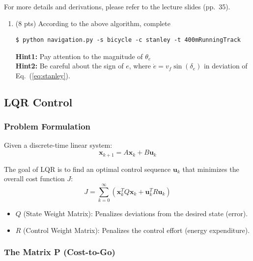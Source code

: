 \documentclass[11pt]{article}
\begin{document}
For more details and derivations, please refer to the lecture slides (pp.~35).

\begin{enumerate}
    \item \textbf{\faPython} (8 pts) According to the above algorithm, complete \textcolor{teal}{}
    \begin{lstlisting}
$ python navigation.py -s bicycle -c stanley -t 400mRunningTrack
    \end{lstlisting}
    \textbf{Hint1:} Pay attention to the magnitude of $\theta_e$ \\
    \textbf{Hint2:} Be careful about the sign of $e$, where $\dot{e} = v_f\sin(\delta_e)$ in deviation of Eq.~(\ref{eq:stanley}).
\end{enumerate}



\subsection{LQR Control}

\subsubsection*{Problem Formulation}

Given a discrete-time linear system:
\begin{equation}
    \mathbf{x}_{k+1} = A \mathbf{x}_k + B \mathbf{u}_k
\end{equation}

The goal of LQR is to find an optimal control sequence $\mathbf{u}_k$ that minimizes the overall cost function $J$:
\begin{equation}
    J = \sum_{k=0}^{\infty} (\mathbf{x}_k^T Q \mathbf{x}_k + \mathbf{u}_k^T R \mathbf{u}_k)
\end{equation}

\begin{itemize}
    \item $Q$ (State Weight Matrix): Penalizes deviations from the desired state (error).
    \item $R$ (Control Weight Matrix): Penalizes the control effort (energy expenditure).
\end{itemize}

\subsubsection*{The Matrix P (Cost-to-Go)}
\end{document}
